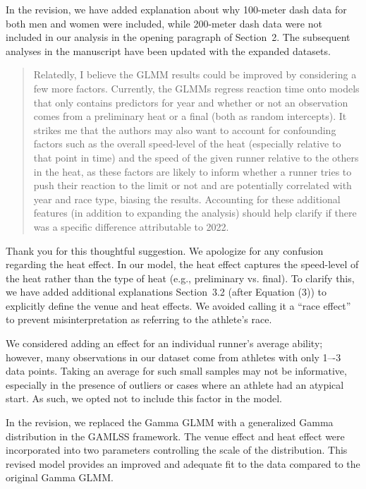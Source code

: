 \documentclass[12pt]{article}
\newenvironment{comment}%
{\begin{quotation}\noindent\small\it\color{darkblue}\ignorespaces%
}{\end{quotation}}
\begin{document}
In the revision, we have added explanation about why 100-meter dash
data for both men and women were included, while 200-meter dash data
were not included in our analysis in the opening paragraph of Section~2.
The subsequent analyses in the manuscript have been updated with the
expanded datasets.


\begin{comment}
Relatedly, I believe the GLMM results could be improved by considering a few
more factors. Currently, the GLMMs regress reaction time onto models that only
contains predictors for year and whether or not an observation comes from a
preliminary heat or a final (both as random intercepts). It strikes me that the
authors may also want to account for confounding factors such as the overall
speed-level of the heat (especially relative to that point in time) and the
speed of the given runner relative to the others in the heat, as these factors
are likely to inform whether a runner tries to push their reaction to the limit
or not and are potentially correlated with year and race type, biasing the
results. Accounting for these additional features (in addition to expanding the
analysis) should help clarify if there was a specific difference attributable to
2022.
\end{comment}


Thank you for this thoughtful suggestion. We apologize for any
confusion regarding the heat effect. In our model, the heat effect
captures the speed-level of the heat rather than the type of heat
(e.g., preliminary vs. final). To clarify this, we have added
additional explanations Section~3.2 (after Equation (3)) to
explicitly define the venue and heat effects. We avoided calling it a
``race effect'' to prevent misinterpretation as referring to the
athlete's race.


We considered adding an effect for an individual runner’s average
ability; however, many observations in our dataset come from athletes
with only 1–-3 data points. Taking an average for such small samples
may not be informative, especially in the presence of outliers or
cases where an athlete had an atypical start. As such, we opted not to
include this factor in the model.


In the revision, we replaced the Gamma GLMM with a generalized Gamma
distribution in the GAMLSS framework. The venue effect and heat effect
were incorporated into two parameters controlling the scale of the
distribution. This revised model provides an improved and adequate fit
to the data compared to the original Gamma GLMM.
\end{document}
